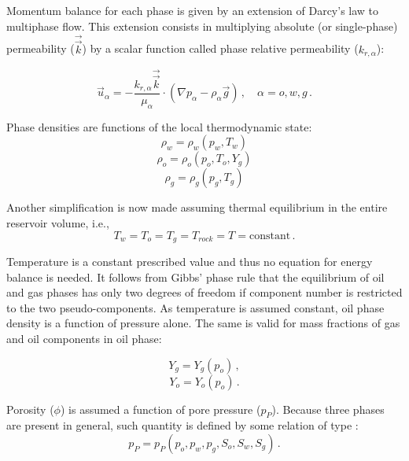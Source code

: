 \documentclass[final,authoryear,5p,times,twocolumn,10pt]{elsarticle}
\begin{document}
Momentum balance for each phase is given by an extension of Darcy's law to multiphase flow. This extension consists in multiplying absolute (or single-phase) permeability ($\vec{\vec{k}}$) by a scalar function called phase relative permeability ($k_{r,\alpha}$):

\begin{equation}\label{eq: exdarcy}
\vec{u}_\alpha = -\frac{k_{r,\alpha} \vec{\vec{k}}}{\mu_\alpha}\cdot \left(\nabla p_\alpha - \rho_\alpha \vec{g}\right) \, , \quad \alpha=o,w,g \, .
\end{equation}

Phase densities are functions of the local thermodynamic state:
\begin{equation}
\rho_w = \rho_w \left(p_w, T_w\right)
\end{equation}
\begin{equation}
\rho_o = \rho_o \left(p_o, T_o,Y_g\right)
\end{equation}
\begin{equation}
\rho_g = \rho_g \left(p_g, T_g\right)
\end{equation}

Another simplification is now made assuming thermal equilibrium in the entire reservoir volume, i.e.,
\begin{equation}
T_w = T_o = T_g = T_{rock} = T = \text{constant} \, .
\end{equation}

Temperature is a constant prescribed value and thus no equation for energy balance is needed. It follows from Gibbs' phase rule that the equilibrium of oil and gas phases has only two degrees of freedom if component number is restricted to the two pseudo-components. As temperature is assumed constant, oil phase density is a function of pressure alone. The same is valid for mass fractions of gas and oil components in oil phase:

\begin{equation}
Y_g = Y_g (p_o) \, ,
\end{equation}
\begin{equation}
Y_o = Y_o (p_o) \, .
\end{equation}

Porosity ($\phi$) is assumed a function of pore pressure ($p_P$). Because three phases are present in general, such quantity is defined by some relation of type \citep{kim2011rigorous}:
\begin{equation}
p_P=p_P\left(p_o,p_w,p_g,S_o,S_w,S_g\right) \, .
\end{equation}
\end{document}

